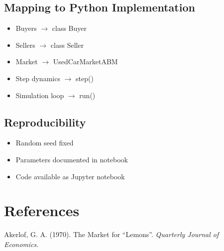 \documentclass[12pt]{article}
\begin{document}
\subsection{Mapping to Python Implementation}

\begin{itemize}
    \item Buyers $\rightarrow$ class Buyer
    \item Sellers $\rightarrow$ class Seller
    \item Market $\rightarrow$ UsedCarMarketABM
    \item Step dynamics $\rightarrow$ step()
    \item Simulation loop $\rightarrow$ run()
\end{itemize}

\subsection{Reproducibility}

\begin{itemize}
    \item Random seed fixed
    \item Parameters documented in notebook
    \item Code available as Jupyter notebook
\end{itemize}

\section*{References}

Akerlof, G. A. (1970). The Market for ``Lemons''. \textit{Quarterly Journal of Economics}.
\end{document}
